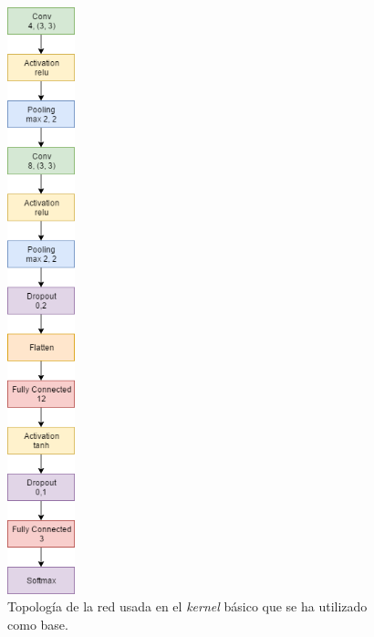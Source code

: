 \begin{figure}[H]
	\centering
	\includegraphics[height=17cm]{img/kernel-cnn}
	\caption{Topología de la red usada en el \textit{kernel} básico que se ha utilizado como base.}
	\label{fig:kernel-cnn}
\end{figure}

